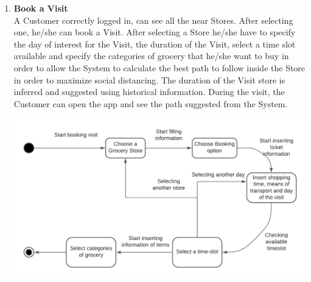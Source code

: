 \documentclass[a4paper, 12pt, oneside]{article}
\begin{document}
\begin{enumerate}
    \item \textbf{Book a Visit}
    \\
       A Customer correctly logged in, can see all the near Stores. After selecting one, he/she can book a Visit. After selecting a Store he/she have to specify the day of interest for the Visit, the duration of the Visit, select a time slot available and specify the categories of grocery that he/she want to buy in order to allow the System to calculate the best path to follow inside the Store in order to maximize social distancing. The duration of the Visit store is inferred and suggested using historical information.
       During the visit, the Customer can open the app and see the path suggested from the System.
    \\
    \begin{minipage}{\linewidth}
            \centering
          \includegraphics[height=0.3\textheight, scale=0.2, keepaspectratio]{img/Booking_diagram.png}
        \end{minipage}
        

\end{enumerate}
\end{document}
